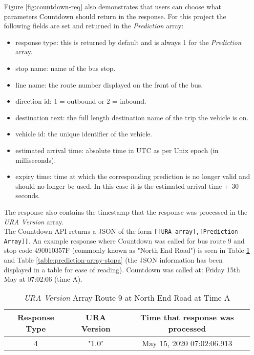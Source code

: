 Figure \ref{fig:countdown-req} also demonstrates that users can choose what parameters Countdown should return in the response. For this project the following fields are set and returned in the \textit{Prediction} array: 
\begin{itemize}
    \item response type: this is returned by default and is always 1 for the \textit{Prediction} array.
    \item stop name: name of the bus stop.
    \item line name: the route number displayed on the front of the bus.
    \item direction id: 1 = outbound or 2 = inbound.
    \item destination text: the full length destination name of the trip the vehicle is on.
    \item vehicle id: the unique identifier of the vehicle.
    \item estimated arrival time: absolute time in UTC as per Unix epoch (in milliseconds).
    \item expiry time: time at which the corresponding prediction is no longer valid and should no longer be used. In this case it is the estimated arrival time + 30 seconds. 
\end{itemize}
The response also contains the timestamp that the response was processed in the \textit{URA Version} array. \\

The Countdown API returns a JSON of the form \texttt{[[URA array],[Prediction Array]]}. An example response where Countdown was called for bus route 9 and stop code 490010357F (commonly known as "North End Road") is seen in Table \ref{table:ura-array-stopa} and Table \ref{table:prediction-array-stopa} (the JSON information has been displayed in a table for ease of reading). Countdown was called at: Friday 15th May at 07:02:06 (time A).

\begin{table}[H]
    \centering
    \begin{tabular}{|c|c|c|}
        \hline
          Response Type & URA Version & Time that response was processed \\
        \hline
           4  & "1.0" & May 15, 2020 07:02:06.913 \\
        \hline
        \end{tabular}
    \caption{\textit{URA Version} Array Route 9 at North End Road at Time A}
    \label{table:ura-array-stopa}
\end{table}

